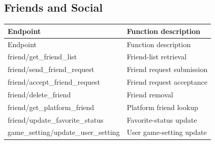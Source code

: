 \subsection{Friends and Social}

\begin{longtable}{>{\ttfamily}p{}p{}}
\toprule
Endpoint & Function description \\
\midrule
\endfirsthead%

\toprule
Endpoint & Function description \\
\midrule
\endhead%

friend/get\_friend\_list
    & Friend-list retrieval \\

friend/send\_friend\_request
    & Friend request submission \\

friend/accept\_friend\_request
    & Friend request acceptance \\

friend/delete\_friend
    & Friend removal \\

friend/get\_platform\_friend
    & Platform friend lookup \\

friend/update\_favorite\_status
    & Favorite-status update \\

game\_setting/update\_user\_setting
    & User game-setting update \\

\bottomrule
\end{longtable}